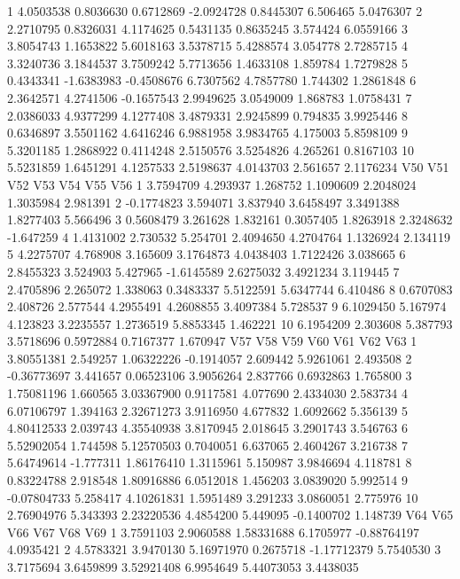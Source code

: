 \documentclass[12pt]{article}
\begin{document}
\begin{Schunk}
\begin{Soutput}
1  4.0503538  0.8036630  0.6712869 -2.0924728 0.8445307 6.506465 5.0476307
2  2.2710795  0.8326031  4.1174625  0.5431135 0.8635245 3.574424 6.0559166
3  3.8054743  1.1653822  5.6018163  3.5378715 5.4288574 3.054778 2.7285715
4  3.3240736  3.1844537  3.7509242  5.7713656 1.4633108 1.859784 1.7279828
5  0.4343341 -1.6383983 -0.4508676  6.7307562 4.7857780 1.744302 1.2861848
6  2.3642571  4.2741506 -0.1657543  2.9949625 3.0549009 1.868783 1.0758431
7  2.0386033  4.9377299  4.1277408  3.4879331 2.9245899 0.794835 3.9925446
8  0.6346897  3.5501162  4.6416246  6.9881958 3.9834765 4.175003 5.8598109
9  5.3201185  1.2868922  0.4114248  2.5150576 3.5254826 4.265261 0.8167103
10 5.5231859  1.6451291  4.1257533  2.5198637 4.0143703 2.561657 2.1176234
          V50      V51      V52        V53       V54       V55       V56
1   3.7594709 4.293937 1.268752  1.1090609 2.2048024 1.3035984  2.981391
2  -0.1774823 3.594071 3.837940  3.6458497 3.3491388 1.8277403  5.566496
3   0.5608479 3.261628 1.832161  0.3057405 1.8263918 2.3248632 -1.647259
4   1.4131002 2.730532 5.254701  2.4094650 4.2704764 1.1326924  2.134119
5   4.2275707 4.768908 3.165609  3.1764873 4.0438403 1.7122426  3.038665
6   2.8455323 3.524903 5.427965 -1.6145589 2.6275032 3.4921234  3.119445
7   2.4705896 2.265072 1.338063  0.3483337 5.5122591 5.6347744  6.410486
8   0.6707083 2.408726 2.577544  4.2955491 4.2608855 3.4097384  5.728537
9   6.1029450 5.167974 4.123823  3.2235557 1.2736519 5.8853345  1.462221
10  6.1954209 2.303608 5.387793  3.5718696 0.5972884 0.7167377  1.670947
           V57       V58        V59        V60      V61        V62      V63
1   3.80551381  2.549257 1.06322226 -0.1914057 2.609442  5.9261061 2.493508
2  -0.36773697  3.441657 0.06523106  3.9056264 2.837766  0.6932863 1.765800
3   1.75081196  1.660565 3.03367900  0.9117581 4.077690  2.4334030 2.583734
4   6.07106797  1.394163 2.32671273  3.9116950 4.677832  1.6092662 5.356139
5   4.80412533  2.039743 4.35540938  3.8170945 2.018645  3.2901743 3.546763
6   5.52902054  1.744598 5.12570503  0.7040051 6.637065  2.4604267 3.216738
7   5.64749614 -1.777311 1.86176410  1.3115961 5.150987  3.9846694 4.118781
8   0.83224788  2.918548 1.80916886  6.0512018 1.456203  3.0839020 5.992514
9  -0.07804733  5.258417 4.10261831  1.5951489 3.291233  3.0860051 2.775976
10  2.76904976  5.343393 2.23220536  4.4854200 5.449095 -0.1400702 1.148739
         V64        V65         V66        V67         V68        V69
1  3.7591103  2.9060588  1.58331688  6.1705977 -0.88764197  4.0935421
2  4.5783321  3.9470130  5.16971970  0.2675718 -1.17712379  5.7540530
3  3.7175694  3.6459899  3.52921408  6.9954649  5.44073053  3.4438035

\end{Soutput}
\end{Schunk}
\end{document}
